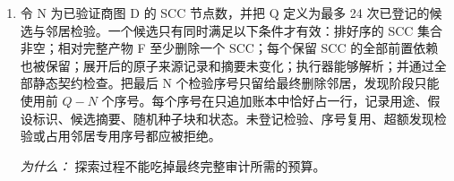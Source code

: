 \documentclass[10pt,a4paper]{article}
\begin{document}
\begin{enumerate}[leftmargin=*,start=4]
\noindent\emph{商图压缩不改变子集对应的可行产物，也不改变其测得的任务效应 \(\Delta \)。}
\par{}
\par\emph{为什么：} 它缩小搜索对象，却不改变哪些可执行产物能够被认证。
  \item 令 N 为已验证商图 D 的 SCC 节点数，并把 Q 定义为最多 24 次已登记的候选与邻居检验。一个候选只有同时满足以下条件才有效：排好序的 SCC 集合非空；相对完整产物 F 至少删除一个 SCC；每个保留 SCC 的全部前置依赖也被保留；展开后的原子来源记录和摘要未变化；执行器能够解析；并通过全部静态契约检查。把最后 N 个检验序号只留给最终删除邻居，发现阶段只能使用前 \(Q- N\) 个序号。每个序号在只追加账本中恰好占一行，记录用途、假设标识、候选摘要、随机种子块和状态。未登记检验、序号复用、超额发现检验或占用邻居专用序号都应被拒绝。
\par\emph{为什么：} 探索过程不能吃掉最终完整审计所需的预算。
\end{enumerate}
\end{document}
